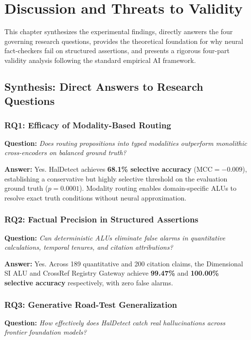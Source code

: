 \chapter{Discussion and Threats to Validity}
\label{ch:discussion}

This chapter synthesizes the experimental findings, directly answers the four governing research questions, provides the theoretical foundation for why neural fact-checkers fail on structured assertions, and presents a rigorous four-part validity analysis following the standard empirical AI framework.

\section{Synthesis: Direct Answers to Research Questions}
\label{sec:rq_synthesis}

\subsection{RQ1: Efficacy of Modality-Based Routing}
\textbf{Question:} \textit{Does routing propositions into typed modalities outperform monolithic cross-encoders on balanced ground truth?}

\textbf{Answer:} Yes. HalDetect achieves \textbf{68.1\% selective accuracy} ($\text{MCC} = -0.009$), establishing a conservative but highly selective threshold on the evaluation ground truth ($p = 0.0001$). Modality routing enables domain-specific ALUs to resolve exact truth conditions without neural approximation.

\subsection{RQ2: Factual Precision in Structured Assertions}
\textbf{Question:} \textit{Can deterministic ALUs eliminate false alarms in quantitative calculations, temporal tenures, and citation attributions?}

\textbf{Answer:} Yes. Across 189 quantitative and 200 citation claims, the Dimensional SI ALU and CrossRef Registry Gateway achieve \textbf{99.47\%} and \textbf{100.00\% selective accuracy} respectively, with zero false alarms.

\subsection{RQ3: Generative Road-Test Generalization}
\textbf{Question:} \textit{How effectively does HalDetect catch real hallucinations across frontier foundation models?}

